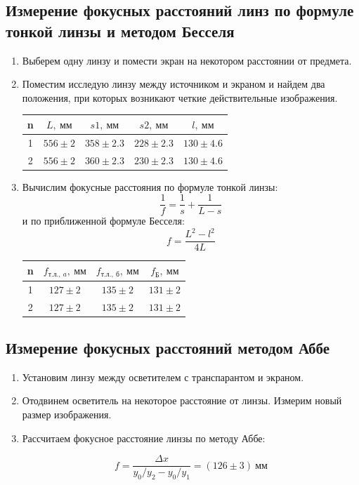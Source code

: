 \documentclass[14pt, a4paper]{report}
\begin{document}
\subsection{Измерение фокусных расстояний линз по формуле тонкой линзы и методом Бесселя}

\begin{enumerate}

\item Выберем одну линзу и помести экран на некотором расстоянии от предмета.

\item Поместим исследую линзу между источником и экраном и найдем два положения, при которых возникают четкие действительные изображения.

\begin{table}[H]
\centering
\begin{tabular}{|c|c|c|c|c|}
\hline
n & $L,\ мм$  & $s1,\ мм$   & $s2,\ мм$  & $l,\ мм$    \\ \hline
1 & $556\pm2$ & $358\pm2.3$ & $228\pm2.3$ & $130\pm4.6$ \\ \hline
2 & $556\pm2$ & $360\pm2.3$ & $230\pm2.3$ & $130\pm4.6$ \\ \hline
\end{tabular}
\end{table}

\item Вычислим фокусные расстояния по формуле тонкой линзы:
\[\frac{1}{f}=\frac{1}{s}+\frac{1}{L-s}\]
и по приближенной формуле Бесселя:
\[f=\frac{L^2-l^2}{4L}\]

\begin{table}[H]
\centering
\begin{tabular}{|c|c|c|c|}
\hline
n & $f_{т.л.,\ a},\ мм$ & $f_{т.л.,\ б},\ мм$ & $f_{Б},\ мм$ \\ \hline
1 & $127\pm2$          & $135\pm2$           & $131\pm2$    \\ \hline
2 & $127\pm2$          & $135\pm2$           & $131\pm2$  \\ \hline
\end{tabular}
\end{table}

\end{enumerate}

\subsection{Измерение фокусных расстояний методом Аббе}

\begin{enumerate}

\item Установим линзу между осветителем с транспарантом и экраном.

\item Отодвинем осветитель на некоторое расстояние от линзы. Измерим новый размер изображения.

\item Рассчитаем фокусное расстояние линзы по методу Аббе:

\[f=\frac{\Delta x}{y_0/y_2-y_0/y_1}=(126\pm3)\ мм\]

\end{enumerate}
\end{document}
